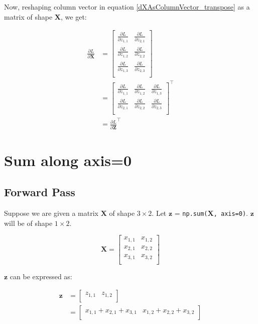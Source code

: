 \documentclass{article}
\newcommand{\transpose}[1]{#1^\top}
\newcommand{\vecr}[1]{\bm{#1}}
\newcommand{\matr}[1]{\mathbf{#1}} %
\begin{document}
Now, reshaping column vector in equation \ref{dXAsColumnVector_transpose} as a matrix of shape $\matr{X}$, we get:

\begin{align}
\frac{\partial L}{\partial \matr{X}} &=
\begin{bmatrix}
\frac{\partial L}{\partial z_{1,1}} &
\frac{\partial L}{\partial z_{2,1}} \\[0.7em]
\frac{\partial L}{\partial z_{1,2}} &
\frac{\partial L}{\partial z_{2,2}} \\[0.7em]
\frac{\partial L}{\partial z_{1,3}} &
\frac{\partial L}{\partial z_{2,3}} \\[0.7em]
\end{bmatrix}
\nonumber \\
&=
\transpose{
\begin{bmatrix}
\frac{\partial L}{\partial z_{1,1}} & \frac{\partial L}{\partial z_{1,2}} & \frac{\partial L}{\partial z_{1,3}} \\[0.5em]
\frac{\partial L}{\partial z_{2,1}} & \frac{\partial L}{\partial z_{2,2}} & \frac{\partial L}{\partial z_{2,3}} \\[0.5em]
\end{bmatrix}}
\nonumber \\
&=
\transpose{\frac{\partial L}{\partial \matr{Z}}}
\end{align}

\section{Sum along axis=0}
\subsection{Forward Pass}
Suppose we are given a matrix $\matr{X}$ of shape $3 \times 2$. Let $\vecr{z}$ = \verb|np.sum(|${\matr{X}}$\verb|, axis=0)|. $\vecr{z}$ will be of shape $1 \times 2$.

\begin{displaymath}
\matr{X} =
\begin{bmatrix}
x_{1,1} & x_{1,2} \\%
x_{2,1} & x_{2,2} \\%
x_{3,1} & x_{3,2} \\%
\end{bmatrix}
\end{displaymath}

$\vecr{z}$ can be expressed as:

\begin{align}
\vecr{z} &=
\begin{bmatrix}
z_{1,1} & z_{1,2} \\%
\end{bmatrix}
\nonumber \\
&=
\begin{bmatrix}
x_{1,1} + x_{2,1} + x_{3,1} &
x_{1,2} + x_{2,2} + x_{3,2} \\%
\end{bmatrix}
\end{align}
\end{document}
